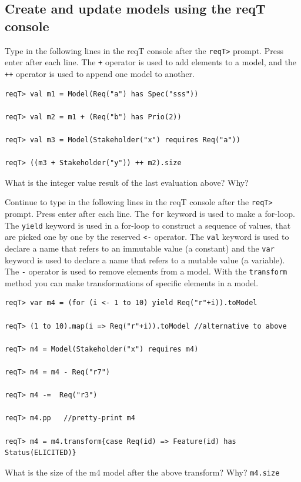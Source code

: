 \documentclass[11pt]{article}
\begin{document}
\subsection{Create and update models using the reqT console}

\begin{framed}\noindent
Type in the following lines in the reqT console after the \verb+reqT>+ prompt. Press enter after each line. The \verb?+? operator is used to add elements to a model, and the  \verb?++? operator is used to append one model to another.

{\small\begin{verbatim}
reqT> val m1 = Model(Req("a") has Spec("sss"))

reqT> val m2 = m1 + (Req("b") has Prio(2))

reqT> val m3 = Model(Stakeholder("x") requires Req("a"))

reqT> ((m3 + Stakeholder("y")) ++ m2).size
\end{verbatim}}


\noindent What is the integer value result of the last evaluation above? Why?
\newline 
\newline
\newline \underline{\hspace{10cm}}

\vspace{7mm}
\noindent Continue to type in the following lines in the reqT console after the \verb+reqT>+ prompt. Press enter after each line. The \verb+for+ keyword is used to make a for-loop. The \verb+yield+ keyword is used in a for-loop to construct a sequence of values, that are picked one by one by the reserved  \verb+<-+ operator.  The \verb+val+ keyword is used to declare a name that refers to an immutable value (a constant) and the \verb+var+ keyword is used to declare a name that refers to a mutable value (a variable). The \verb?-? operator is used to remove elements from a model. With the \verb+transform+ method you can make transformations of specific elements in a model. 


{\scriptsize\begin{verbatim}
reqT> var m4 = (for (i <- 1 to 10) yield Req("r"+i)).toModel

reqT> (1 to 10).map(i => Req("r"+i)).toModel //alternative to above

reqT> m4 = Model(Stakeholder("x") requires m4)

reqT> m4 = m4 - Req("r7")

reqT> m4 -=  Req("r3")

reqT> m4.pp   //pretty-print m4

reqT> m4 = m4.transform{case Req(id) => Feature(id) has Status(ELICITED)}
\end{verbatim}}
\end{framed}
\begin{framed}\noindent
What is the size of the m4 model after the above transform? Why?
\newline
\verb+m4.size+
\newline
\newline \underline{\hspace{10cm}}
\end{framed}
\end{document}
